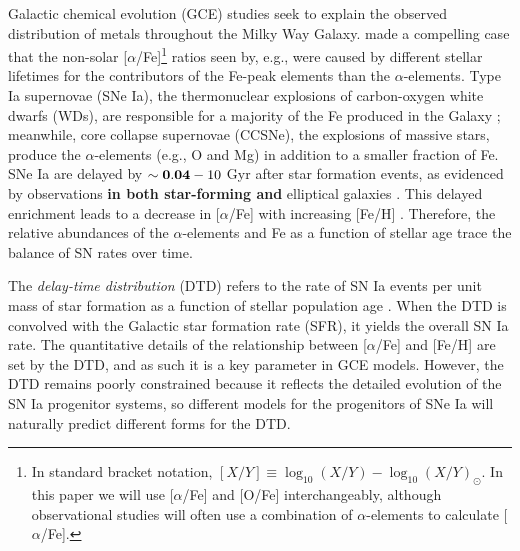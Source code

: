 \documentclass[twocolumn,twocolappendix,linenumbers]{aastex631}
\newcommand{\aFe}{[$\alpha$/Fe]\xspace}
\begin{document}
Galactic chemical evolution (GCE) studies seek to explain the observed distribution of metals throughout the Milky Way Galaxy. \citet{Tinsley1979-StellarLifetimes} made a compelling case that the non-solar \aFe\footnote{
    In standard bracket notation, $[X/Y]\equiv \log_{10}(X/Y) - \log_{10}(X/Y)_{\odot}$. In this paper we will use \aFe and [O/Fe] interchangeably, although observational studies will often use a combination of $\alpha$-elements to calculate \aFe.
} ratios seen by, e.g., \citet{Wallerstein1962-GDwarfAbundances} were caused by different stellar lifetimes for the contributors of the Fe-peak elements than the $\alpha$-elements. Type Ia supernovae (SNe Ia), the thermonuclear explosions of carbon-oxygen white dwarfs (WDs), are responsible for a majority of the Fe produced in the Galaxy \citep{Matteucci1986-SupernovaEnrichment}; meanwhile, core collapse supernovae (CCSNe), the explosions of massive stars, produce the $\alpha$-elements (e.g., O and Mg) in addition to a smaller fraction of Fe. SNe Ia are delayed by $\sim{\bf 0.04}-10$ Gyr after star formation events, as evidenced by observations {\bf in both star-forming and} elliptical galaxies \citep[e.g.,][]{Maza1976-SNStatistics}. This delayed enrichment leads to a decrease in \aFe with increasing [Fe/H] \citep{Matteucci1986-SupernovaEnrichment}. Therefore, the relative abundances of the $\alpha$-elements and Fe as a function of stellar age trace the balance of SN rates over time.

The {\it delay-time distribution} (DTD) refers to the rate of SN Ia events per unit mass of star formation as a function of stellar population age \citep[for a review, see Section 3.5 of][]{Maoz2014-Review}. When the DTD is convolved with the Galactic star formation rate (SFR), it yields the overall SN Ia rate. The quantitative details of the relationship between \aFe and [Fe/H] are set by the DTD, and as such it is a key parameter in GCE models. However, the DTD remains poorly constrained because it reflects the detailed evolution of the SN Ia progenitor systems, so different models for the progenitors of SNe Ia will naturally predict different forms for the DTD.
\end{document}
